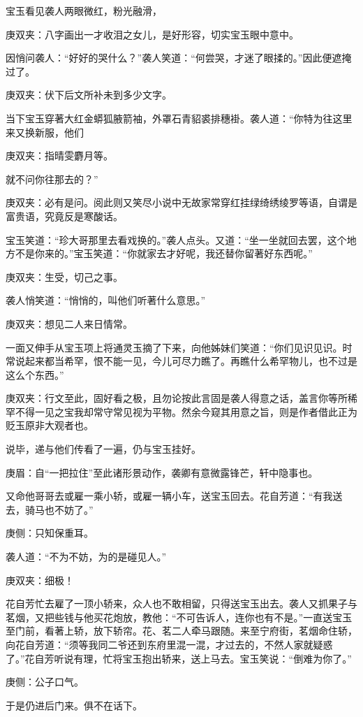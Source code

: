 \begin{parag}
    宝玉看见袭人两眼微红，粉光融滑，\begin{note}庚双夹：八字画出一才收泪之女儿，是好形容，切实宝玉眼中意中。\end{note}因悄问袭人：“好好的哭什么？”袭人笑道：“何尝哭，才迷了眼揉的。”因此便遮掩过了。\begin{note}庚双夹：伏下后文所补未到多少文字。\end{note}当下宝玉穿著大红金蟒狐腋箭袖，外罩石青貂裘排穗褂。袭人道：“你特为往这里来又换新服，他们\begin{note}庚双夹：指晴雯麝月等。\end{note}就不问你往那去的？”\begin{note}庚双夹：必有是问。阅此则又笑尽小说中无故家常穿红挂绿绮绣绫罗等语，自谓是富贵语，究竟反是寒酸话。\end{note}宝玉笑道：“珍大哥那里去看戏换的。”袭人点头。又道：“坐一坐就回去罢，这个地方不是你来的。”宝玉笑道：“你就家去才好呢，我还替你留著好东西呢。”\begin{note}庚双夹：生受，切己之事。\end{note}袭人悄笑道：“悄悄的，叫他们听著什么意思。”\begin{note}庚双夹：想见二人来日情常。\end{note}一面又伸手从宝玉项上将通灵玉摘了下来，向他姊妹们笑道：“你们见识见识。时常说起来都当希罕，恨不能一见，今儿可尽力瞧了。再瞧什么希罕物儿，也不过是这么个东西。”\begin{note}庚双夹：行文至此，固好看之极，且勿论按此言固是袭人得意之话，盖言你等所稀罕不得一见之宝我却常守常见视为平物。然余今窥其用意之旨，则是作者借此正为贬玉原非大观者也。\end{note}说毕，递与他们传看了一遍，仍与宝玉挂好。\begin{note}庚眉：自“一把拉住”至此诸形景动作，袭卿有意微露锋芒，轩中隐事也。\end{note}又命他哥哥去或雇一乘小轿，或雇一辆小车，送宝玉回去。花自芳道：“有我送去，骑马也不妨了。”\begin{note}庚侧：只知保重耳。\end{note}袭人道：“不为不妨，为的是碰见人。”\begin{note}庚双夹：细极！\end{note}
\end{parag}


\begin{parag}
    花自芳忙去雇了一顶小轿来，众人也不敢相留，只得送宝玉出去。袭人又抓果子与茗烟，又把些钱与他买花炮放，教他：“不可告诉人，连你也有不是。”一直送宝玉至门前，看著上轿，放下轿帘。花、茗二人牵马跟随。来至宁府街，茗烟命住轿，向花自芳道：“须等我同二爷还到东府里混一混，才过去的，不然人家就疑惑了。”花自芳听说有理，忙将宝玉抱出轿来，送上马去。宝玉笑说：“倒难为你了。”\begin{note}庚侧：公子口气。\end{note}于是仍进后门来。俱不在话下。
\end{parag}


